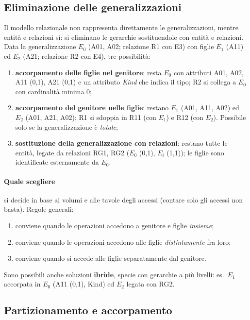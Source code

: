 \documentclass[a4paper,12pt]{article}
\begin{document}
\subsection{Eliminazione delle generalizzazioni}

Il modello relazionale non rappresenta direttamente le generalizzazioni,
mentre entità e relazioni sì: si eliminano le gerarchie sostituendole con
entità e relazioni. Data la generalizzazione $E_0$ (A01, A02; relazione R1 con
E3) con figlie $E_1$ (A11) ed $E_2$ (A21; relazione R2 con E4), tre
possibilità:
\begin{enumerate}
  \item \textbf{accorpamento delle figlie nel genitore}: resta $E_0$ con
    attributi A01, A02, A11 (0,1), A21 (0,1) e un attributo \emph{Kind} che
    indica il tipo; R2 si collega a $E_0$ con cardinalità minima 0;
  \item \textbf{accorpamento del genitore nelle figlie}: restano $E_1$ (A01,
    A11, A02) ed $E_2$ (A01, A21, A02); R1 si sdoppia in R11 (con $E_1$) e R12
    (con $E_2$). Possibile solo se la generalizzazione è \emph{totale};
  \item \textbf{sostituzione della generalizzazione con relazioni}: restano
    tutte le entità, legate da relazioni RG1, RG2 ($E_0$ (0,1), $E_i$ (1,1));
    le figlie sono identificate esternamente da $E_0$.
\end{enumerate}

\paragraph{Quale scegliere} si decide in base ai volumi e alle tavole degli
accessi (contare solo gli accessi non basta). Regole generali:
\begin{enumerate}
  \item conviene quando le operazioni accedono a genitore e figlie
    \emph{insieme};
  \item conviene quando le operazioni accedono alle figlie \emph{distintamente}
    fra loro;
  \item conviene quando si accede alle figlie separatamente dal genitore.
\end{enumerate}
Sono possibili anche soluzioni \textbf{ibride}, specie con gerarchie a più
livelli: es.\ $E_1$ accorpata in $E_0$ (A11 (0,1), Kind) ed $E_2$ legata con
RG2.

\subsection{Partizionamento e accorpamento}
\end{document}
